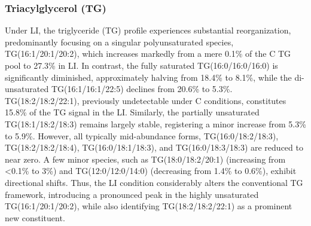 \documentclass[10pt,letterpaper]{article}
\begin{document}
\subsubsection*{Triacylglycerol (TG)} 
Under LI, the triglyceride (TG) profile experiences substantial reorganization, predominantly focusing on a singular polyunsaturated species, TG(16:1/20:1/20:2), which increases markedly from a mere 0.1\% of the C TG pool to 27.3\% in LI. In contrast, the fully saturated TG(16:0/16:0/16:0) is significantly diminished, approximately halving from 18.4\% to 8.1\%, while the di-unsaturated TG(16:1/16:1/22:5) declines from 20.6\% to 5.3\%. TG(18:2/18:2/22:1), previously undetectable under C conditions, constitutes 15.8\% of the TG signal in the LI. Similarly, the partially unsaturated TG(18:1/18:2/18:3) remains largely stable, registering a minor increase from 5.3\% to 5.9\%. However, all typically mid-abundance forms, TG(16:0/18:2/18:3), TG(18:2/18:2/18:4), TG(16:0/18:1/18:3), and TG(16:0/18:3/18:3) are reduced to near zero. A few minor species, such as TG(18:0/18:2/20:1) (increasing from \textless0.1\% to 3\%) and TG(12:0/12:0/14:0) (decreasing from 1.4\% to 0.6\%), exhibit directional shifts. Thus, the LI condition considerably alters the conventional TG framework, introducing a pronounced peak in the highly unsaturated TG(16:1/20:1/20:2), while also identifying TG(18:2/18:2/22:1) as a prominent new constituent.
\end{document}
